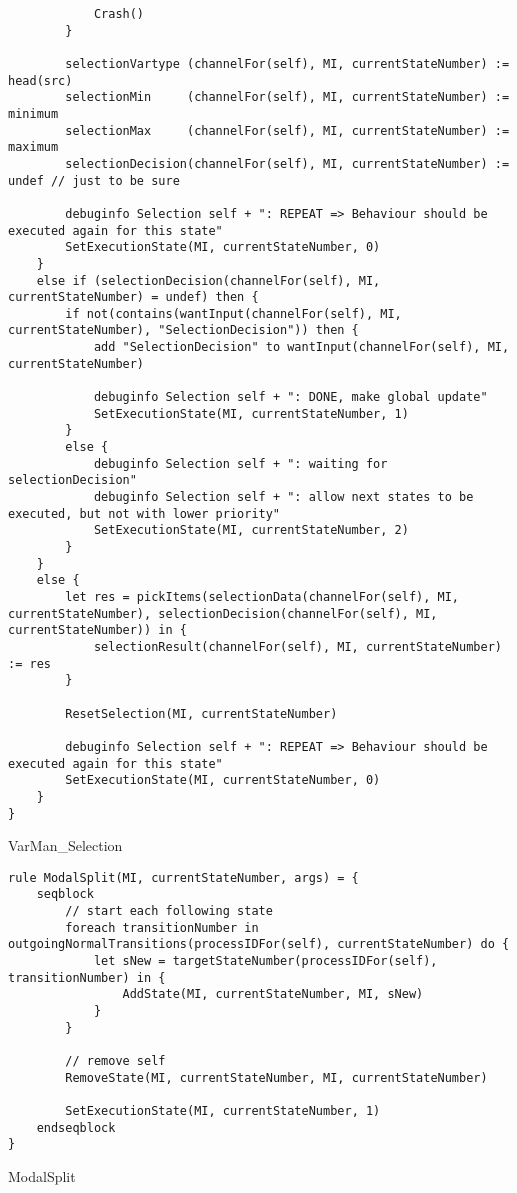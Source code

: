 \begin{listing}[H]
\begin{verbatim}
            Crash()
        }

        selectionVartype (channelFor(self), MI, currentStateNumber) := head(src)
        selectionMin     (channelFor(self), MI, currentStateNumber) := minimum
        selectionMax     (channelFor(self), MI, currentStateNumber) := maximum
        selectionDecision(channelFor(self), MI, currentStateNumber) := undef // just to be sure

        debuginfo Selection self + ": REPEAT => Behaviour should be executed again for this state"
        SetExecutionState(MI, currentStateNumber, 0)
    }
    else if (selectionDecision(channelFor(self), MI, currentStateNumber) = undef) then {
        if not(contains(wantInput(channelFor(self), MI, currentStateNumber), "SelectionDecision")) then {
            add "SelectionDecision" to wantInput(channelFor(self), MI, currentStateNumber)

            debuginfo Selection self + ": DONE, make global update"
            SetExecutionState(MI, currentStateNumber, 1)
        }
        else {
            debuginfo Selection self + ": waiting for selectionDecision"
            debuginfo Selection self + ": allow next states to be executed, but not with lower priority"
            SetExecutionState(MI, currentStateNumber, 2)
        }
    }
    else {
        let res = pickItems(selectionData(channelFor(self), MI, currentStateNumber), selectionDecision(channelFor(self), MI, currentStateNumber)) in {
            selectionResult(channelFor(self), MI, currentStateNumber) := res
        }

        ResetSelection(MI, currentStateNumber)

        debuginfo Selection self + ": REPEAT => Behaviour should be executed again for this state"
        SetExecutionState(MI, currentStateNumber, 0)
    }
}
\end{verbatim}
\caption{VarMan_Selection}
\label{lst:asm:VarMan_Selection}
\end{listing}




\begin{listing}[H]
\begin{verbatim}
rule ModalSplit(MI, currentStateNumber, args) = {
    seqblock
        // start each following state
        foreach transitionNumber in outgoingNormalTransitions(processIDFor(self), currentStateNumber) do {
            let sNew = targetStateNumber(processIDFor(self), transitionNumber) in {
                AddState(MI, currentStateNumber, MI, sNew)
            }
        }

        // remove self
        RemoveState(MI, currentStateNumber, MI, currentStateNumber)

        SetExecutionState(MI, currentStateNumber, 1)
    endseqblock
}
\end{verbatim}
\caption{ModalSplit}
\label{lst:asm:ModalSplit}
\end{listing}




